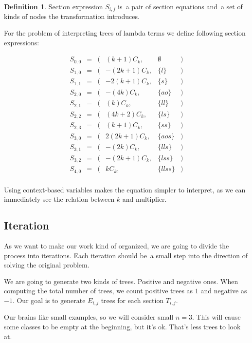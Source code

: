 \documentclass[final]{article}
\theoremstyle{definition}
\newtheorem{definition}{Definition}[subsection]
\theoremstyle{definition}
\theoremstyle{remark}
\begin{document}
\begin{definition}
    Section expression \(S_{i, j}\) is~a pair of section equations and~a set of kinds of nodes the transformation introduces.
\end{definition}

For the problem of interpreting trees of lambda terms we define following section expressions:

\[\begin{array}{rccrlc}
        S_{0,0} &=& (& (k + 1) C_k,& \emptyset &)\\
        S_{1,0} &=& (& - (2 k + 1) C_k,& \{l\} &)\\
        S_{1,1} &=& (& - 2 (k + 1) C_k,& \{s\} &)\\
        S_{2,0} &=& (& - (4 k) C_k,& \{ao\} &)\\
        S_{2,1} &=& (& (k) C_k,& \{ll\} &)\\
        S_{2,2} &=& (& (4 k + 2) C_k,& \{ls\} &)\\
        S_{2,3} &=& (& (k + 1) C_k,& \{ss\} &)\\
        S_{3,0} &=& (& 2 (2 k + 1) C_k,& \{aos\} &)\\
        S_{3,1} &=& (& - (2 k) C_k,& \{lls\} &)\\
        S_{3,2} &=& (& - (2 k + 1) C_k,& \{lss\} &)\\
        S_{4,0} &=& (& k C_k,& \{llss\} &)\\
\end{array}\]

Using context-based variables makes the equation simpler to interpret, as we can immediately see the relation between \(k\) and multiplier.

\subsection{Iteration}%
\label{sub:iteration}

As we want to make our work kind of organized, we are going to divide the process into iterations. Each iteration should be~a small step into the direction of solving the original problem.

We are going to generate two kinds of trees. Positive and negative ones. When computing the total number of trees, we count positive trees as \(1\) and negative as \(-1\). Our goal is to generate \(E_{i, j}\) trees for each section \(T_{i, j}\).

Our brains like small examples, so we will consider small \(n = 3\). This will cause some classes to be empty at the beginning, but it's ok. That's less trees to look at.
\end{document}
